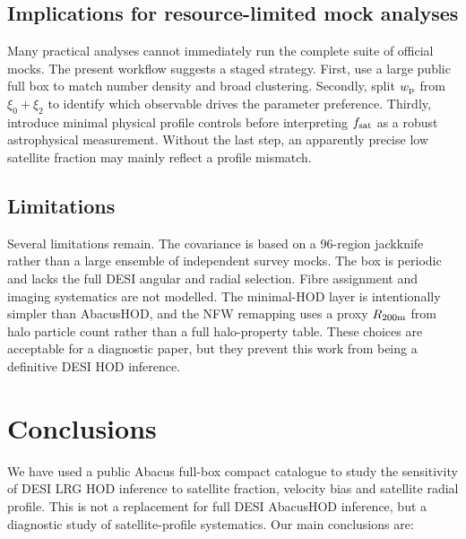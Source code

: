 \documentclass[fleqn,usenatbib]{mnras}
\newcommand{\fsat}{f_{\rm sat}}
\newcommand{\wproj}{w_{\rm p}}
\newcommand{\xizero}{\xi_0}
\newcommand{\xitwo}{\xi_2}
\begin{document}
\subsection{Implications for resource-limited mock analyses}

Many practical analyses cannot immediately run the complete suite of official mocks.  The present workflow suggests a staged strategy.  First, use a large public full box to match number density and broad clustering.  Secondly, split $\wproj$ from $\xizero+\xitwo$ to identify which observable drives the parameter preference.  Thirdly, introduce minimal physical profile controls before interpreting $\fsat$ as a robust astrophysical measurement.  Without the last step, an apparently precise low satellite fraction may mainly reflect a profile mismatch.

\subsection{Limitations}

Several limitations remain.  The covariance is based on a 96-region jackknife rather than a large ensemble of independent survey mocks.  The box is periodic and lacks the full DESI angular and radial selection.  Fibre assignment and imaging systematics are not modelled.  The minimal-HOD layer is intentionally simpler than AbacusHOD, and the NFW remapping uses a proxy $R_{200{\rm m}}$ from halo particle count rather than a full halo-property table.  These choices are acceptable for a diagnostic paper, but they prevent this work from being a definitive DESI HOD inference.

\section{Conclusions}
\label{sec:conclusions}

We have used a public Abacus full-box compact catalogue to study the sensitivity of DESI LRG HOD inference to satellite fraction, velocity bias and satellite radial profile.  This is not a replacement for full DESI AbacusHOD inference, but a diagnostic study of satellite-profile systematics.  Our main conclusions are:
\end{document}
